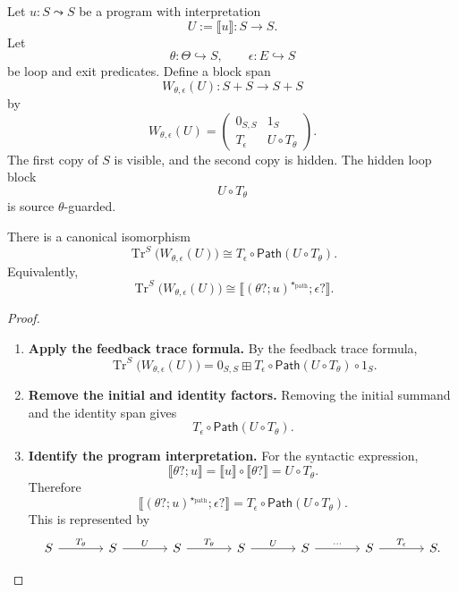 Let \(u:S\leadsto S\) be a program with interpretation
\[
  U:=\llbracket u\rrbracket:S\to S.
\]
Let
\[
  \theta:\Theta\hookrightarrow S,
  \qquad
  \epsilon:E\hookrightarrow S
\]
be loop and exit predicates. Define a block span
\[
  W_{\theta,\epsilon}(U):S+S\to S+S
\]
by
\[
  W_{\theta,\epsilon}(U)
  =
  \begin{pmatrix}
    0_{S,S} & 1_S\\
    T_\epsilon & U\circ T_\theta
  \end{pmatrix}.
\]
The first copy of \(S\) is visible, and the second copy is hidden. The hidden
loop block
\[
  U\circ T_\theta
\]
is source \(\theta\)-guarded.

\begin{theorem}
\label{thm:guarded-while-as-guarded-trace}
There is a canonical isomorphism
\[
  \operatorname{Tr}^{S}
  \bigl(
    W_{\theta,\epsilon}(U)
  \bigr)
  \cong
  T_\epsilon\circ\mathsf{Path}(U\circ T_\theta).
\]
Equivalently,
\[
  \operatorname{Tr}^{S}
  \bigl(
    W_{\theta,\epsilon}(U)
  \bigr)
  \cong
  \llbracket
    (\theta?;u)^{\star_{\mathrm{path}}};\epsilon?
  \rrbracket .
\]
\end{theorem}

\begin{proof}
\begin{enumerate}
  \item \textbf{Apply the feedback trace formula.}
  By the feedback trace formula,
  \[
    \operatorname{Tr}^{S}
    \bigl(
      W_{\theta,\epsilon}(U)
    \bigr)
    =
    0_{S,S}
    \boxplus
    T_\epsilon
    \circ
    \mathsf{Path}(U\circ T_\theta)
    \circ
    1_S.
  \]

  \item \textbf{Remove the initial and identity factors.}
  Removing the initial summand and the identity span gives
  \[
    T_\epsilon\circ\mathsf{Path}(U\circ T_\theta).
  \]

  \item \textbf{Identify the program interpretation.}
  For the syntactic expression,
  \[
    \llbracket\theta?;u\rrbracket
    =
    \llbracket u\rrbracket\circ\llbracket\theta?\rrbracket
    =
    U\circ T_\theta.
  \]
  Therefore
  \[
    \llbracket
      (\theta?;u)^{\star_{\mathrm{path}}};\epsilon?
    \rrbracket
    =
    T_\epsilon\circ\mathsf{Path}(U\circ T_\theta).
  \]
  This is represented by
  \[
  \begin{tikzcd}[column sep=large,row sep=large]
    S
      \ar[r,"T_\theta"]
    &
    S
      \ar[r,"U"]
    &
    S
      \ar[r,"T_\theta"]
    &
    S
      \ar[r,"U"]
    &
    S
      \ar[r,"\cdots"]
    &
    S
      \ar[r,"T_\epsilon"]
    &
    S .
  \end{tikzcd}
  \]
\end{enumerate}
\end{proof}


